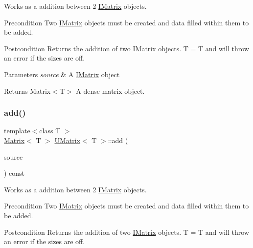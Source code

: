 Works as a addition between 2 \mbox{\hyperlink{class_i_matrix}{I\+Matrix}} objects. 

\begin{DoxyPrecond}{Precondition}
Two \mbox{\hyperlink{class_i_matrix}{I\+Matrix}} objects must be created and data filled within them to be added. 
\end{DoxyPrecond}
\begin{DoxyPostcond}{Postcondition}
Returns the addition of two \mbox{\hyperlink{class_i_matrix}{I\+Matrix}} objects. T = T and will throw an error if the sizes are off.
\end{DoxyPostcond}

\begin{DoxyParams}{Parameters}
{\em source} & A \mbox{\hyperlink{class_i_matrix}{I\+Matrix}} object \\
\hline
\end{DoxyParams}
\begin{DoxyReturn}{Returns}
Matrix$<$\+T$>$ A dense matrix object. 
\end{DoxyReturn}
\mbox{\label{class_u_matrix_ad8d5f4dc3945dbeec02c90db85266c39}} 
\subsubsection{\texorpdfstring{add()}{add()}\hspace{0.1cm}{\footnotesize\ttfamily [4/6]}}
{\footnotesize\ttfamily template$<$class T $>$ \\
\mbox{\hyperlink{class_matrix}{Matrix}}$<$ T $>$ \mbox{\hyperlink{class_u_matrix}{U\+Matrix}}$<$ T $>$\+::add (\begin{DoxyParamCaption}\item[{const \mbox{\hyperlink{class_i_matrix}{I\+Matrix}}$<$ \mbox{\hyperlink{class_u_matrix}{U\+Matrix}}$<$ T $>$, T $>$ \&}]{source }\end{DoxyParamCaption}) const\hspace{0.3cm}{\ttfamily [virtual]}}



Works as a addition between 2 \mbox{\hyperlink{class_i_matrix}{I\+Matrix}} objects. 

\begin{DoxyPrecond}{Precondition}
Two \mbox{\hyperlink{class_i_matrix}{I\+Matrix}} objects must be created and data filled within them to be added. 
\end{DoxyPrecond}
\begin{DoxyPostcond}{Postcondition}
Returns the addition of two \mbox{\hyperlink{class_i_matrix}{I\+Matrix}} objects. T = T and will throw an error if the sizes are off.
\end{DoxyPostcond}

